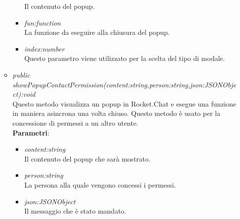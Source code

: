\begin{itemize}
\begin{itemize}
\begin{itemize}
				Il contenuto del popup.
				\item \textit{fun:function}\\
				La funzione da eseguire alla chiusura del popup.
				\item \textit{index:number}\\
				Questo parametro viene utilizzato per la scelta del tipo di modale.
			\end{itemize}
	\item \textit{public showPopupContactPermission(content:string,person:string,json:JSONObject):void}\\
	Questo metodo visualizza un popup in Rocket.Chat e esegue una funzione in maniera asincrona una volta chiuso. Questo metodo è usato per la concessione di permessi a un altro utente.
			\\ \textbf{Parametri}: \begin{itemize}
				\item \textit{content:string}\\
				Il contenuto del popup che sarà mostrato.
				\item \textit{person:string}\\
				La persona alla quale vengono concessi i permessi.
				\item \textit{json:JSONObject}\\
				Il messaggio che è stato mandato.
			\end{itemize}
	\end{itemize}
\end{itemize}